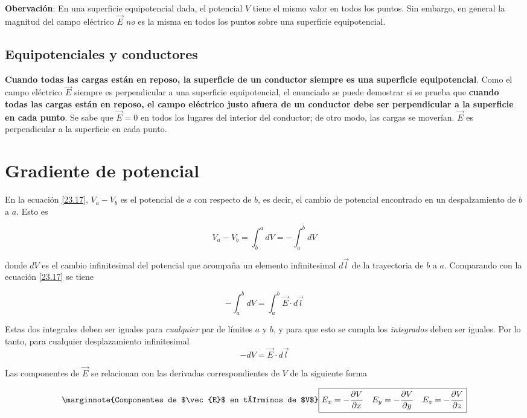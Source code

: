 \textbf{Obervación}: En una superficie equipotencial dada, el potencial $V$ tiene el mismo valor en todos los puntos. Sin embargo, en general la magnitud del campo eléctrico $\vec{E}$ \textit{no} es la misma en todos los puntos sobre una superficie equipotencial.

\subsection{Equipotenciales y conductores}
\textbf{Cuando todas las cargas están en reposo, la superficie de un conductor siempre es una superficie equipotencial}. Como el campo eléctrico $\vec{E}$ siempre es perpendicular a una superficie equipotencial, el enunciado se puede demostrar si se prueba que \textbf{cuando todas las cargas están en reposo, el campo eléctrico justo afuera de un conductor debe ser perpendicular a la superficie en cada punto}. Se sabe que $\vec{E}=0$ en todos los lugares del interior del conductor; de otro modo, las cargas se moverían. $\vec{E}$ es perpendicular a la superficie en cada punto.

\section{Gradiente de potencial}
En la ecuación \ref{23.17}, $V_a-V_b$ es el potencial de $a$ con respecto de $b$, es decir, el cambio de potencial encontrado en un despalzamiento de $b$ a $a$. Esto es 

\begin{equation*}
V_a-V_b=\int_b^adV=-\int	_a^bdV
\end{equation*}

donde $dV$ es el cambio infinitesimal del potencial que acompaña un elemento infinitesimal $d\vec{l}$ de la trayectoria de $b$ a $a$. Comparando con la ecuación \ref{23.17} se tiene

\begin{equation*}
-\int_a^bdV=\int_a^b\vec{E}\cdot d\vec{l}
\end{equation*}

Estas dos integrales deben ser iguales para \textit{cualquier} par de límites $a$ y $b$, y para que esto se cumpla los \textit{integrados} deben ser iguales. Por lo tanto, para cualquier desplazamiento infinitesimal $$-dV=\vec{E}\cdot d\vec{l}$$

Las componentes de $\vec{E}$ se relacionan con las derivadas correspondientes de $V$ de la siguiente forma

\begin{equation}\label{23.19}\marginnote{Componentes de $\vec{E}$ en términos de $V$}
\boxed{E_x=-\frac{\partial V}{\partial x} \quad E_y=-\frac{\partial V}{\partial y} \quad E_z=-\frac{\partial V}{\partial z}}
\end{equation}

